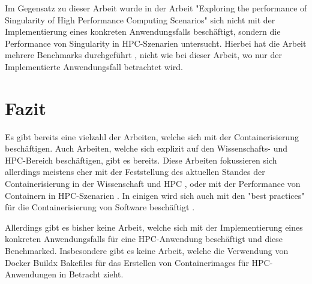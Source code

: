 Im Gegensatz zu dieser Arbeit wurde in der Arbeit "Exploring the performance of Singularity of High Performance Computing Scenarios" \cite{huExploringPerformanceSingularity2019} sich nicht mit der Implementierung eines konkreten Anwendungsfalls beschäftigt, sondern die Performance von Singularity in HPC-Szenarien untersucht. Hierbei hat die Arbeit mehrere Benchmarks durchgeführt \cite[Vgl. S. 2587]{huExploringPerformanceSingularity2019}, nicht wie bei dieser Arbeit, wo nur der Implementierte Anwendungsfall betrachtet wird.  


\section{Fazit}

Es gibt bereits eine vielzahl der Arbeiten, welche sich mit der Containerisierung beschäftigen. Auch Arbeiten, welche sich explizit auf den Wissenschafts- und HPC-Bereich beschäftigen, gibt es bereits. Diese Arbeiten fokussieren sich allerdings meistens eher mit der Feststellung des aktuellen Standes der Containerisierung in der Wissenschaft und HPC \cite{moreauContainersComputationalReproducibility2023}, oder mit der Performance von Containern in HPC-Szenarien \cite{huExploringPerformanceSingularity2019}. In einigen wird sich auch mit den "best practices" für die Containerisierung von Software beschäftigt \cite{fachrudinImplementationAnalysisContainer2025}.

Allerdings gibt es bisher keine Arbeit, welche sich mit der Implementierung eines konkreten Anwendungsfalls für eine HPC-Anwendung beschäftigt und diese Benchmarked. Insbesondere gibt es keine Arbeit, welche die Verwendung von Docker Buildx Bakefiles für das Erstellen von Containerimages für HPC-Anwendungen in Betracht zieht.



